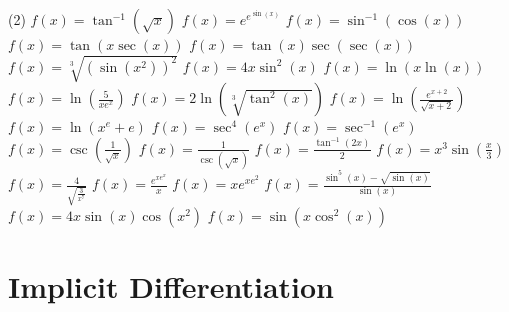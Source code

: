 \documentclass[12pt,]{book}
\theoremstyle{plain}
\theoremstyle{definition}
\numberwithin{equation}{section}
\newcommand{\fe}[2]{#1\mathopen{}\left(#2\right)\mathclose{}}
\begin{document}
\begin{exercisegroup}(2)
\exercise[16.]\hypertarget{exercise-497}{\null}\(\fe{f}{x}=\fe{\tan^{-1}}{\sqrt{x}}\)%
\exercise[17.]\hypertarget{exercise-498}{\null}\(\fe{f}{x}=e^{e^{\fe{\sin}{x}}}\)%
\exercise[18.]\hypertarget{exercise-499}{\null}\(\fe{f}{x}=\fe{\sin^{-1}}{\fe{\cos}{x}}\)%
\exercise[19.]\hypertarget{exercise-500}{\null}\(\fe{f}{x}=\fe{\tan}{x\fe{\sec}{x}}\)%
\exercise[20.]\hypertarget{exercise-501}{\null}\(\fe{f}{x}=\fe{\tan}{x}\fe{\sec}{\fe{\sec}{x}}\)%
\exercise[21.]\hypertarget{exercise-502}{\null}\(\fe{f}{x}=\sqrt[3]{\left(\fe{\sin}{x^2}\right)^2}\)%
\exercise[22.]\hypertarget{exercise-503}{\null}\(\fe{f}{x}=4x\fe{\sin^2}{x}\)%
\exercise[23.]\hypertarget{exercise-504}{\null}\(\fe{f}{x}=\fe{\ln}{x\fe{\ln}{x}}\)%
\exercise[24.]\hypertarget{exercise-505}{\null}\(\fe{f}{x}=\fe{\ln}{\frac{5}{xe^x}}\)%
\exercise[25.]\hypertarget{exercise-506}{\null}\(\fe{f}{x}=2\fe{\ln}{\sqrt[3]{\fe{\tan^2}{x}}}\)%
\exercise[26.]\hypertarget{exercise-507}{\null}\(\fe{f}{x}=\fe{\ln}{\frac{e^{x+2}}{\sqrt{x+2}}}\)%
\exercise[27.]\hypertarget{exercise-508}{\null}\(\fe{f}{x}=\fe{\ln}{x^e+e}\)%
\exercise[28.]\hypertarget{exercise-509}{\null}\(\fe{f}{x}=\fe{\sec^4}{e^x}\)%
\exercise[29.]\hypertarget{exercise-510}{\null}\(\fe{f}{x}=\fe{\sec^{-1}}{e^x}\)%
\exercise[30.]\hypertarget{exercise-511}{\null}\(\fe{f}{x}=\fe{\csc}{\frac{1}{\sqrt{x}}}\)%
\exercise[31.]\hypertarget{exercise-512}{\null}\(\fe{f}{x}=\frac{1}{\fe{\csc}{\sqrt{x}}}\)%
\exercise[32.]\hypertarget{exercise-513}{\null}\(\fe{f}{x}=\frac{\fe{\tan^{-1}}{2x}}{2}\)%
\exercise[33.]\hypertarget{exercise-514}{\null}\(\fe{f}{x}=x^3\fe{\sin}{\frac{x}{3}}\)%
\exercise[34.]\hypertarget{exercise-515}{\null}\(\fe{f}{x}=\frac{4}{\sqrt{\frac{3}{x^7}}}\)%
\exercise[35.]\hypertarget{exercise-516}{\null}\(\fe{f}{x}=\frac{e^{xe^x}}{x}\)%
\exercise[36.]\hypertarget{exercise-517}{\null}\(\fe{f}{x}=xe^{xe^2}\)%
\exercise[37.]\hypertarget{exercise-518}{\null}\(\fe{f}{x}=\frac{\fe{\sin^5}{x}-\sqrt{\fe{\sin}{x}}}{\fe{\sin}{x}}\)%
\exercise[38.]\hypertarget{exercise-519}{\null}\(\fe{f}{x}=4x\fe{\sin}{x}\fe{\cos}{x^2}\)%
\exercise[39.]\hypertarget{exercise-520}{\null}\(\fe{f}{x}=\fe{\sin}{x\fe{\cos^2}{x}}\)%
\end{exercisegroup}
\par\smallskip\noindent
\typeout{************************************************}
\typeout{************************************************}
\chapter[Implicit Differentiation]{Implicit Differentiation}\label{chapter-implicit-differentiation}
\typeout{************************************************}
\typeout{************************************************}
\end{document}
